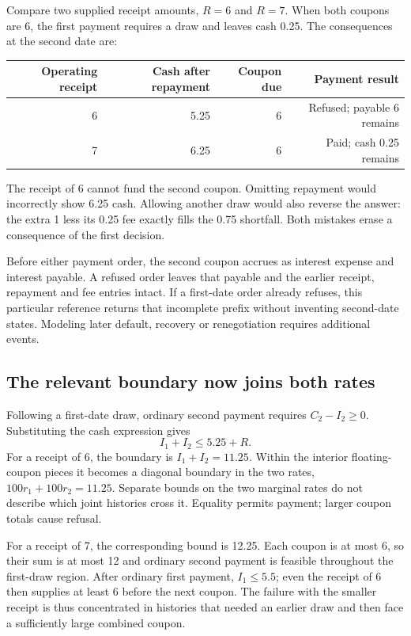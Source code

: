 Compare two supplied receipt amounts, $R=6$ and $R=7$. When both coupons are 6, the first payment requires a draw and leaves cash 0.25. The consequences at the second date are:
\begin{center}
\begin{tabular}{rrrr}
\toprule
Operating receipt & Cash after repayment & Coupon due & Payment result\\
\midrule
6 & 5.25 & 6 & Refused; payable 6 remains\\
7 & 6.25 & 6 & Paid; cash 0.25 remains\\
\bottomrule
\end{tabular}
\end{center}
The receipt of 6 cannot fund the second coupon. Omitting repayment would incorrectly show 6.25 cash. Allowing another draw would also reverse the answer: the extra 1 less its 0.25 fee exactly fills the 0.75 shortfall. Both mistakes erase a consequence of the first decision.

Before either payment order, the second coupon accrues as interest expense and interest payable. A refused order leaves that payable and the earlier receipt, repayment and fee entries intact. If a first-date order already refuses, this particular reference returns that incomplete prefix without inventing second-date states. Modeling later default, recovery or renegotiation requires additional events.

\subsection{The relevant boundary now joins both rates}

Following a first-date draw, ordinary second payment requires $C_2-I_2\geq0$. Substituting the cash expression gives
\begin{equation}
 I_1+I_2\leq5.25+R.
\end{equation}
For a receipt of 6, the boundary is $I_1+I_2=11.25$. Within the interior floating-coupon pieces it becomes a diagonal boundary in the two rates, $100r_1+100r_2=11.25$. Separate bounds on the two marginal rates do not describe which joint histories cross it. Equality permits payment; larger coupon totals cause refusal.

For a receipt of 7, the corresponding bound is 12.25. Each coupon is at most 6, so their sum is at most 12 and ordinary second payment is feasible throughout the first-draw region. After ordinary first payment, $I_1\leq5.5$; even the receipt of 6 then supplies at least 6 before the next coupon. The failure with the smaller receipt is thus concentrated in histories that needed an earlier draw and then face a sufficiently large combined coupon.


